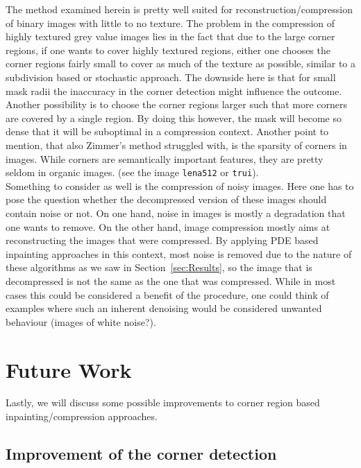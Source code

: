 The method examined herein is pretty well suited for reconstruction/compression of binary images
with little to no texture. The problem in the compression of highly textured grey value images lies in the 
fact that due to the large corner regions, if one wants to cover highly textured regions, either
one chooses the corner regions fairly small to cover as much of the texture as possible, similar to
a subdivision based or stochastic approach. The downside here is that for small mask radii the
inaccuracy in the corner detection might influence the outcome. Another possibility is to choose
the corner regions larger such that more corners are covered by a single region. By doing this
however, the mask will become so dense that it will be suboptimal in a compression context.
Another point to mention, that also Zimmer's method\cite{zimmer07} struggled with, is the sparsity
of corners in images. While corners are semantically important features, they are pretty seldom in
organic images. (see the image \texttt{lena512} or \texttt{trui}).\\
Something to consider as well is the compression of noisy images. Here one has to pose the question
whether the decompressed version of these images should contain noise or not. On one hand, noise in
images is mostly a degradation that one wants to remove. On the other hand, image compression
mostly aims at reconstructing the images that were compressed. By applying PDE based inpainting
approaches in this context, most noise is removed due to the nature of these algorithms as we saw
in Section~\ref{sec:Results}, so the image that is decompressed is not the same as the one that was
compressed. While in most cases this could be considered a benefit of the procedure, one could
think of examples where such an inherent denoising would be considered unwanted behaviour (images
of white noise?).\\

\section{Future Work}\label{sec:FutureWork}

Lastly, we will discuss some possible improvements to corner region based inpainting/compression
approaches.

\subsection*{Improvement of the corner detection}

